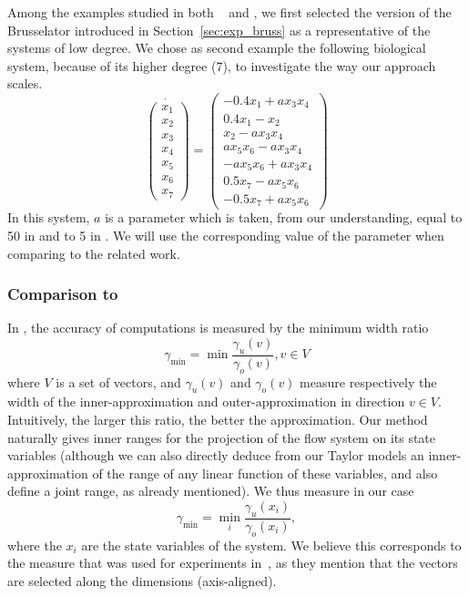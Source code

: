 Among the examples studied in both ~\cite{Underapproxflowpipes} and \cite{underapprox16}, we first selected
the version of the Brusselator introduced in Section~\ref{sec:exp_bruss} as a representative of the systems of low degree. 
We chose as second example the following biological system, because of its higher degree (7), to investigate the way our approach scales. 
\begin{equation}
\dot{\left(\begin{array}{c}
x_1 \\
x_2 \\
x_3 \\
x_4 \\
x_5 \\
x_6 \\
x_7
\end{array}\right)} = \left(\begin{array}{c}
-0.4x_1+ a x_3x_4 \\
0.4x_1-x_2 \\
x_2- a x_3x_4 \\
a x_5x_6- a x_3x_4 \\
- a x_5x_6+ a x_3x_4 \\
0.5x_7- a x_5x_6 \\
-0.5x_7+ a x_5x_6
\end{array}\right)
\end{equation}
In this system, $a$ is a parameter which is taken, from our understanding, equal to 50 in \cite{Underapproxflowpipes} and to 5 in \cite{underapprox16}. 
We will use the corresponding value of the parameter when comparing to the related work.

\subsubsection{Comparison to \cite{Underapproxflowpipes}}
In  \cite{Underapproxflowpipes}, the  accuracy of computations is measured by the minimum width ratio 
\[ \gamma_{\min}=\min{\frac{\gamma_u(v)}{\gamma_o(v)}}, v \in V \]
where $V$ is a set of vectors, and $\gamma_u(v)$ and $\gamma_o(v)$ measure respectively the width of the inner-approximation and outer-approximation
in direction $v \in V$. 
Intuitively, the larger this ratio, the better the approximation. 
Our method naturally gives inner ranges for the projection of the flow system on its state variables (although we can also directly deduce from our Taylor models 
an inner-approximation of the range of any linear function of these variables, and also define a joint range, as 
already mentioned).
We thus measure in our case \[ \gamma_{\min}=\min_{i}{\frac{\gamma_u(x_i)}{\gamma_o(x_i)}}, \]
where the $x_i$ are the state variables of the system. We believe this corresponds to the measure that was used for experiments 
in~\cite{Underapproxflowpipes}, as they mention that the vectors are selected along the dimensions (axis-aligned).

